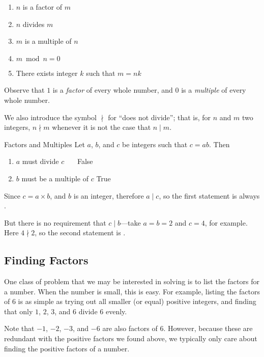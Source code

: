 \documentclass[a4paper,10pt]{report}
\begin{document}
\begin{enumerate}
  \item \(n\) is a factor of \(m\)
  \item \(n\) divides \(m\)
  \item \(m\) is a multiple of \(n\)
  \item \(m \bmod n = 0\)
  \item There exists integer \(k\) such that \(m = nk\)
\end{enumerate}

Observe that \(1\) is a \emph{factor} of every whole number, and \(0\) is a
\emph{multiple} of every whole number.

We also introduce the symbol \(\nmid\) for ``does not divide''; that is, for
\(n\) and \(m\) two integers, \(n \nmid m\) whenever it is not the case that
\(n \mid m\).

\begin{problem}{Factors and Multiples}
 Let \(a\), \(b\), and \(c\) be integers such that \(c = ab\). Then
 \begin{enumerate}
  \item \(a\) must divide \(c\) \hfill {}~~~False
  \item \(b\) must be a multiple of \(c\) \hfill True~~~
 \end{enumerate}

 \begin{solution}
  Since \(c = a \times b\), and \(b\) is an integer, therefore \(a \mid c\), so
  the first statement is always .

  But there is no requirement that \(c \mid b\)---take \(a = b = 2\) and \(c =
  4\), for example. Here \(4 \nmid 2\), so the second statement is
  .
 \end{solution}
\end{problem}

\subsection{Finding Factors}

One class of problem that we may be interested in solving is to list the
factors for a number. When the number is small, this is easy. For example,
listing the factors of \(6\) is as simple as trying out all smaller (or equal)
positive integers, and finding that only \(1\), \(2\), \(3\), and \(6\) divide
\(6\) evenly.

Note that \(-1\), \(-2\), \(-3\), and \(-6\) are also factors of \(6\).
However, because these are redundant with the positive factors we found above,
we typically only care about finding the positive factors of a number.
\end{document}
